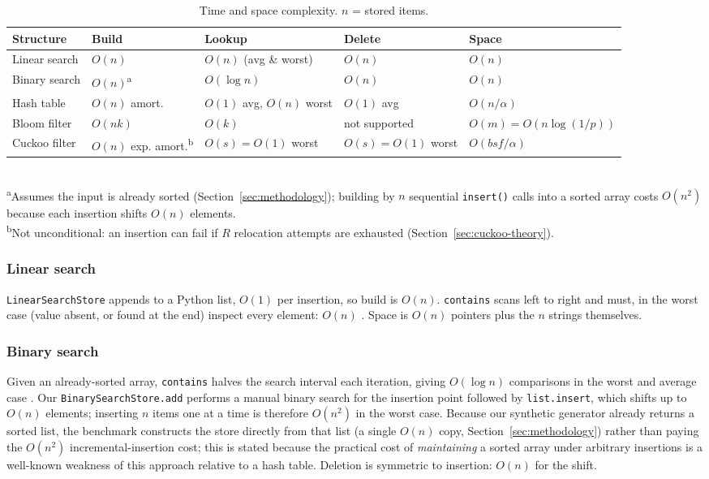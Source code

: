 \documentclass[acmsmall,screen,nonacm=true]{acmart}
\begin{document}
\begin{table}[t]
\caption{Time and space complexity. $n$ = stored items.}
\label{tab:complexity}
\begin{tabular}{lllll}
\toprule
Structure & Build & Lookup & Delete & Space \\
\midrule
Linear search   & $O(n)$ & $O(n)$ (avg \& worst) & $O(n)$ & $O(n)$ \\
Binary search   & $O(n)$\textsuperscript{a} & $O(\log n)$ & $O(n)$ & $O(n)$ \\
Hash table      & $O(n)$ amort. & $O(1)$ avg, $O(n)$ worst & $O(1)$ avg & $O(n/\alpha)$ \\
Bloom filter    & $O(nk)$ & $O(k)$ & not supported & $O(m)=O(n\log(1/p))$ \\
Cuckoo filter   & $O(n)$ exp. amort.\textsuperscript{b} & $O(s)=O(1)$ worst & $O(s)=O(1)$ worst & $O(bsf/\alpha)$ \\
\bottomrule
\end{tabular}
\\[2pt]
\footnotesize
\textsuperscript{a}Assumes the input is already sorted (Section~\ref{sec:methodology}); building by
$n$ sequential \texttt{insert()} calls into a sorted array costs $O(n^2)$ because
each insertion shifts $O(n)$ elements. \\
\textsuperscript{b}Not unconditional: an insertion can fail if $R$ relocation
attempts are exhausted (Section~\ref{sec:cuckoo-theory}).
\end{table}

\subsubsection{Linear search}
\texttt{LinearSearchStore} appends to a Python list, $O(1)$ per insertion, so
build is $O(n)$. \texttt{contains} scans left to right and must, in the
worst case (value absent, or found at the end) inspect every element:
$O(n)$ \cite{knuth1998}. Space is $O(n)$ pointers plus the $n$ strings
themselves.

\subsubsection{Binary search}
Given an already-sorted array, \texttt{contains} halves the search interval
each iteration, giving $O(\log n)$ comparisons in the worst and average case
\cite{cormen2009}. Our \texttt{BinarySearchStore.add} performs a manual
binary search for the insertion point followed by \texttt{list.insert},
which shifts up to $O(n)$ elements; inserting $n$ items one at a time is
therefore $O(n^2)$ in the worst case. Because our synthetic generator
already returns a sorted list, the benchmark constructs the store directly
from that list (a single $O(n)$ copy, Section~\ref{sec:methodology}) rather
than paying the $O(n^2)$ incremental-insertion cost; this is stated because
the practical cost of \emph{maintaining} a sorted array under arbitrary
insertions is a well-known weakness of this approach relative to a hash
table. Deletion is symmetric to insertion: $O(n)$ for the shift.
\end{document}
